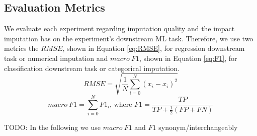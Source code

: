 \subsection{Evaluation Metrics}
%
We evaluate each experiment regarding imputation quality and the impact imputation has on the experiment's downstream ML task. Therefore, we use two metrics the $RMSE$, shown in Equation \ref{eq:RMSE}, for regression downstream task or numerical imputation and $macro\ F1$, shown in Equation \ref{eq:F1}, for classification downstream task or categorical imputation.
%
\begin{equation}
	RMSE = \sqrt{\frac{1}{N} \sum_{i = 0}^{N} (x_i - \hat{x_i})^2}
	\label{eq:RMSE}
\end{equation}
%
\begin{equation}
	macro\ F1 = \sum_{i = 0}^{N} F1_i\text{, where }F1 = \frac{TP}{TP + \frac{1}{2}(FP + FN)}
	\label{eq:F1}
\end{equation}

TODO: In the following we use $macro\ F1$ and $F1$ synonym/interchangeably
